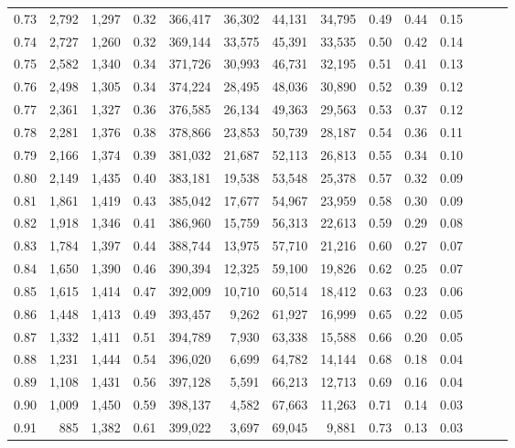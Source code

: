 \begin{tabular}{rrrrrrrrrrrrrr}
0.73 &  2,792 &  1,297 &  0.32 &  366,417 &   36,302 &  44,131 &  34,795 &  0.49 &  0.44 &      0.15 \\
0.74 &  2,727 &  1,260 &  0.32 &  369,144 &   33,575 &  45,391 &  33,535 &  0.50 &  0.42 &      0.14 \\
0.75 &  2,582 &  1,340 &  0.34 &  371,726 &   30,993 &  46,731 &  32,195 &  0.51 &  0.41 &      0.13 \\
0.76 &  2,498 &  1,305 &  0.34 &  374,224 &   28,495 &  48,036 &  30,890 &  0.52 &  0.39 &      0.12 \\
0.77 &  2,361 &  1,327 &  0.36 &  376,585 &   26,134 &  49,363 &  29,563 &  0.53 &  0.37 &      0.12 \\
0.78 &  2,281 &  1,376 &  0.38 &  378,866 &   23,853 &  50,739 &  28,187 &  0.54 &  0.36 &      0.11 \\
0.79 &  2,166 &  1,374 &  0.39 &  381,032 &   21,687 &  52,113 &  26,813 &  0.55 &  0.34 &      0.10 \\
0.80 &  2,149 &  1,435 &  0.40 &  383,181 &   19,538 &  53,548 &  25,378 &  0.57 &  0.32 &      0.09 \\
0.81 &  1,861 &  1,419 &  0.43 &  385,042 &   17,677 &  54,967 &  23,959 &  0.58 &  0.30 &      0.09 \\
0.82 &  1,918 &  1,346 &  0.41 &  386,960 &   15,759 &  56,313 &  22,613 &  0.59 &  0.29 &      0.08 \\
0.83 &  1,784 &  1,397 &  0.44 &  388,744 &   13,975 &  57,710 &  21,216 &  0.60 &  0.27 &      0.07 \\
0.84 &  1,650 &  1,390 &  0.46 &  390,394 &   12,325 &  59,100 &  19,826 &  0.62 &  0.25 &      0.07 \\
0.85 &  1,615 &  1,414 &  0.47 &  392,009 &   10,710 &  60,514 &  18,412 &  0.63 &  0.23 &      0.06 \\
0.86 &  1,448 &  1,413 &  0.49 &  393,457 &    9,262 &  61,927 &  16,999 &  0.65 &  0.22 &      0.05 \\
0.87 &  1,332 &  1,411 &  0.51 &  394,789 &    7,930 &  63,338 &  15,588 &  0.66 &  0.20 &      0.05 \\
0.88 &  1,231 &  1,444 &  0.54 &  396,020 &    6,699 &  64,782 &  14,144 &  0.68 &  0.18 &      0.04 \\
0.89 &  1,108 &  1,431 &  0.56 &  397,128 &    5,591 &  66,213 &  12,713 &  0.69 &  0.16 &      0.04 \\
0.90 &  1,009 &  1,450 &  0.59 &  398,137 &    4,582 &  67,663 &  11,263 &  0.71 &  0.14 &      0.03 \\
0.91 &    885 &  1,382 &  0.61 &  399,022 &    3,697 &  69,045 &   9,881 &  0.73 &  0.13 &      0.03 \\

\end{tabular}
